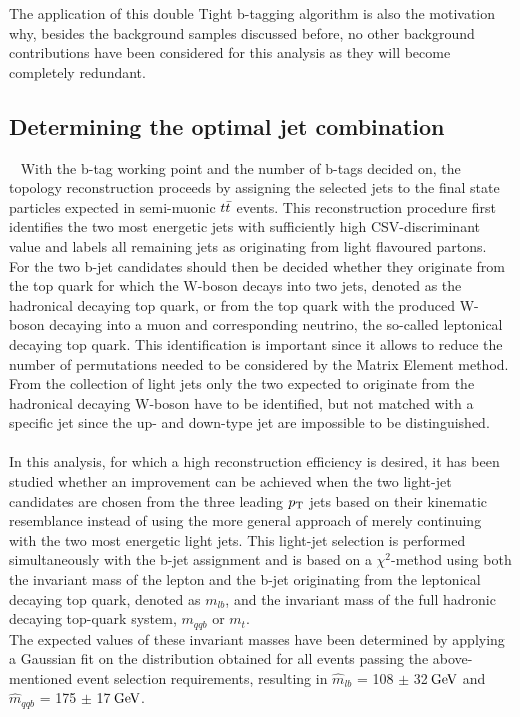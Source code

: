 The application of this double Tight b-tagging algorithm is also the motivation why, besides the background samples discussed before, no other background contributions have been considered for this analysis as they will become completely redundant.

\subsection{Determining the optimal jet combination} ~\label{subsec::JetCombi}
With the b-tag working point and the number of b-tags decided on, the topology reconstruction proceeds by assigning the selected jets to the final state particles expected in semi-muonic $t\bar{t}$ events.
This reconstruction procedure first identifies the two most energetic jets with sufficiently high CSV-discriminant value and labels all remaining jets as originating from light flavoured partons.
\\
For the two b-jet candidates should then be decided whether they originate from the top quark for which the W-boson decays into two jets, denoted as the hadronical decaying top quark, or from the top quark with the produced W-boson decaying into a muon and corresponding neutrino, the so-called leptonical decaying top quark.
This identification is important since it allows to reduce the number of permutations needed to be considered by the Matrix Element method.
From the collection of light jets only the two expected to originate from the hadronical decaying W-boson have to be identified, but not matched with a specific jet since the up- and down-type jet are impossible to be distinguished. %
\\
\\
In this analysis, for which a high reconstruction efficiency is desired, it has been studied whether an improvement can be achieved when the two light-jet candidates are chosen from the three leading $p_{\rm T}$ jets based on their kinematic resemblance instead of using the more general approach of merely continuing with the two most energetic light jets.
This light-jet selection is performed simultaneously with the b-jet assignment and is based on a $\chi^{2}$-method using both the invariant mass of the lepton and the b-jet originating from the leptonical decaying top quark, denoted as $m_{lb}$, and the invariant mass of the full hadronic decaying top-quark system, $m_{qqb}$ or $m_{t}$.
\\
The expected values of these invariant masses have been determined by applying a Gaussian fit on the distribution obtained for all events passing the above-mentioned event selection requirements, resulting in $\hat{m}_{lb}$ =  108 $\pm$ 32$\, \mathrm{GeV}$ and $\hat{m}_{qqb}$ = 175 $\pm$ 17$\, \mathrm{GeV}$.
